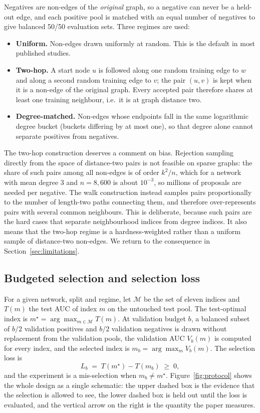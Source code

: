 \documentclass{comjnl}
\begin{document}
Negatives are non-edges of the \emph{original} graph, so a negative can never be a held-out edge, and each positive pool is matched with an equal number of negatives to give balanced 50/50 evaluation sets. Three regimes are used:

\begin{itemize}
\item \textbf{Uniform.} Non-edges drawn uniformly at random. This is the default in most published studies.
\item \textbf{Two-hop.} A start node $u$ is followed along one random training edge to $w$ and along a second random training edge to $v$; the pair $(u,v)$ is kept when it is a non-edge of the original graph. Every accepted pair therefore shares at least one training neighbour, i.e.\ it is at graph distance two.
\item \textbf{Degree-matched.} Non-edges whose endpoints fall in the same logarithmic degree bucket (buckets differing by at most one), so that degree alone cannot separate positives from negatives.
\end{itemize}

The two-hop construction deserves a comment on bias. Rejection sampling directly from the space of distance-two pairs is not feasible on sparse graphs: the share of such pairs among all non-edges is of order $k^2/n$, which for a network with mean degree 3 and $n=8{,}600$ is about $10^{-3}$, so millions of proposals are needed per negative. The walk construction instead samples pairs proportionally to the number of length-two paths connecting them, and therefore over-represents pairs with several common neighbours. This is deliberate, because such pairs are the hard cases that separate neighbourhood indices from degree indices. It also means that the two-hop regime is a hardness-weighted rather than a uniform sample of distance-two non-edges. We return to the consequence in Section~\ref{sec:limitations}.

\subsection{Budgeted selection and selection loss}
\label{sec:loss}

For a given network, split and regime, let $\mathcal{M}$ be the set of eleven indices and $T(m)$ the test AUC of index $m$ on the untouched test pool. The test-optimal index is $m^\star=\arg\max_{m\in\mathcal{M}}T(m)$. At validation budget $b$, a balanced subset of $b/2$ validation positives and $b/2$ validation negatives is drawn without replacement from the validation pools, the validation AUC $V_b(m)$ is computed for every index, and the selected index is $m_b=\arg\max_{m}V_b(m)$. The selection loss is
\begin{equation}
L_b \;=\; T(m^\star) - T(m_b) \;\ge\; 0 ,
\label{eq:loss}
\end{equation}
and the experiment is a mis-selection when $m_b\neq m^\star$. Figure~\ref{fig:protocol} shows the whole design as a single schematic: the upper dashed box is the evidence that the selection is allowed to see, the lower dashed box is held out until the loss is evaluated, and the vertical arrow on the right is the quantity the paper measures.
\end{document}
